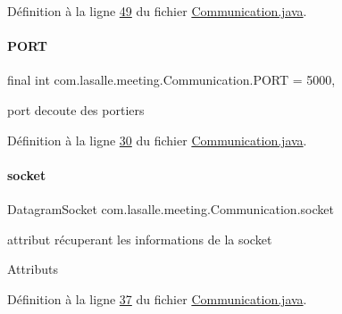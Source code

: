 Définition à la ligne \hyperlink{_communication_8java_source_l00049}{49} du fichier \hyperlink{_communication_8java_source}{Communication.\+java}.

\mbox{\label{classcom_1_1lasalle_1_1meeting_1_1_communication_abf48fd6a29d87d67f4941494404f1ea7}} 
\paragraph{\texorpdfstring{P\+O\+RT}{PORT}}
{\footnotesize\ttfamily final int com.\+lasalle.\+meeting.\+Communication.\+P\+O\+RT = 5000\hspace{0.3cm}{\ttfamily [static]}, {\ttfamily [private]}}



port d\textquotesingle{}ecoute des portiers 



Définition à la ligne \hyperlink{_communication_8java_source_l00030}{30} du fichier \hyperlink{_communication_8java_source}{Communication.\+java}.

\mbox{\label{classcom_1_1lasalle_1_1meeting_1_1_communication_a2a538f36640aecebbb833bbaf1f03858}} 
\paragraph{\texorpdfstring{socket}{socket}}
{\footnotesize\ttfamily Datagram\+Socket com.\+lasalle.\+meeting.\+Communication.\+socket\hspace{0.3cm}{\ttfamily [private]}}



attribut récuperant les informations de la socket 

Attributs 

Définition à la ligne \hyperlink{_communication_8java_source_l00037}{37} du fichier \hyperlink{_communication_8java_source}{Communication.\+java}.

